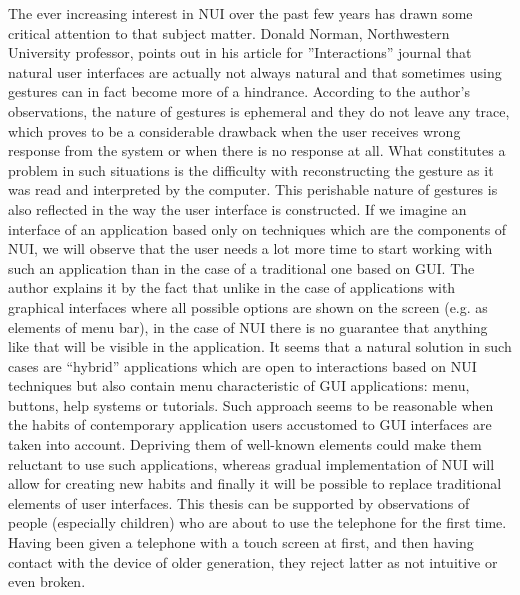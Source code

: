 \documentclass{jacsart}
\begin{document}
\indent The ever increasing interest in NUI over the past few years has drawn some critical attention to that subject matter. Donald Norman, Northwestern University professor, points out in his article for ''Interactions'' journal \cite{Norman2010} that natural user interfaces are actually not always natural and that sometimes using gestures can in fact become more of a hindrance. According to the author’s observations, the nature of gestures is ephemeral and they do not leave any trace, which proves to be a considerable drawback when the user receives wrong response from the system or when there is no response at all.  What constitutes a problem in such situations is the difficulty with reconstructing the gesture as it was read and interpreted by the computer. This perishable nature of gestures is also reflected in the way the user interface is constructed. If we imagine an interface of an application based only on techniques which are the components of NUI, we will observe that the user needs a lot more time to start working with such an application than in the case of a traditional one based on GUI. The author explains it by the fact that unlike in the case of applications with graphical interfaces where all possible options are shown on the screen (e.g. as elements of menu bar), in the case of NUI there is no guarantee that anything like that will be visible in the application. It seems that a natural solution in such cases are “hybrid” applications which are open to interactions based on NUI techniques but also contain menu characteristic of GUI applications: menu, buttons, help systems or tutorials. Such approach seems to be reasonable when the habits of contemporary application users accustomed to GUI interfaces are taken into account. Depriving them of well-known elements could make them reluctant to use such applications, whereas gradual implementation of NUI will allow for creating new habits and finally it will be possible to replace traditional elements of user interfaces. This thesis can be supported by observations of people (especially children) who are about to use the telephone for the first time. Having been given a telephone with a touch screen at first, and then having contact with the device of older generation, they reject latter as not intuitive or even broken. \\
\end{document}
